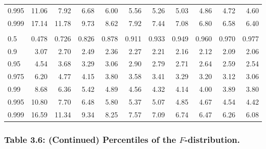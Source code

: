 \documentclass[]{article}
\begin{document}
\begin{table}[H]
\begin{tabular}{lrrrrrrrrrr}
\hspace{1em}0.995 & 11.06 & 7.92 & 6.68 & 6.00 & 5.56 & 5.26 & 5.03 & 4.86 & 4.72 & 4.60\\
\hspace{1em}0.999 & 17.14 & 11.78 & 9.73 & 8.62 & 7.92 & 7.44 & 7.08 & 6.80 & 6.58 & 6.40\\
\addlinespace[0.3em]
\multicolumn{11}{l}{\textbf{$k_2=15$}}\\
\hspace{1em}0.5 & 0.478 & 0.726 & 0.826 & 0.878 & 0.911 & 0.933 & 0.949 & 0.960 & 0.970 & 0.977\\
\hspace{1em}0.9 & 3.07 & 2.70 & 2.49 & 2.36 & 2.27 & 2.21 & 2.16 & 2.12 & 2.09 & 2.06\\
\hspace{1em}0.95 & 4.54 & 3.68 & 3.29 & 3.06 & 2.90 & 2.79 & 2.71 & 2.64 & 2.59 & 2.54\\
\hspace{1em}0.975 & 6.20 & 4.77 & 4.15 & 3.80 & 3.58 & 3.41 & 3.29 & 3.20 & 3.12 & 3.06\\
\hspace{1em}0.99 & 8.68 & 6.36 & 5.42 & 4.89 & 4.56 & 4.32 & 4.14 & 4.00 & 3.89 & 3.80\\
\hspace{1em}0.995 & 10.80 & 7.70 & 6.48 & 5.80 & 5.37 & 5.07 & 4.85 & 4.67 & 4.54 & 4.42\\
\hspace{1em}0.999 & 16.59 & 11.34 & 9.34 & 8.25 & 7.57 & 7.09 & 6.74 & 6.47 & 6.26 & 6.08\\
\bottomrule
\end{tabular}
\end{table}

\hypertarget{table-3.6-continued-percentiles-of-the-f-distribution.}{%
\subsubsection{\texorpdfstring{Table 3.6: (Continued) Percentiles of the
\(F\)-distribution.}{Table 3.6: (Continued) Percentiles of the F-distribution.}}\label{table-3.6-continued-percentiles-of-the-f-distribution.}}
\end{document}
